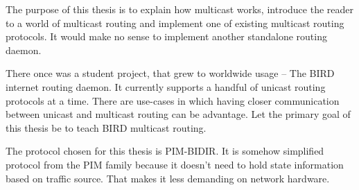 The purpose of this thesis is to explain how multicast works, introduce the reader to a world of multicast routing and implement one of existing multicast routing
protocols. It would make no sense to implement another standalone routing
daemon.

There once was a student project, that grew to worldwide usage -- The BIRD
internet routing daemon. It currently supports a handful of unicast routing
protocols at a time. There are use-cases in which having closer communication
between unicast and multicast routing can be advantage. Let the primary goal of
this thesis be to teach BIRD multicast routing.

The protocol chosen for this thesis is PIM-BIDIR. It is somehow simplified
protocol from the PIM family because it doesn't need to hold state information
based on traffic source. That makes it less demanding on network hardware.
